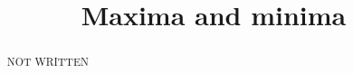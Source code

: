 \documentclass{ximera}
\title[Dig-In:]{Maxima and minima}
\begin{document}
\begin{abstract}
  NOT WRITTEN
\end{abstract}
\maketitle
\end{document}
